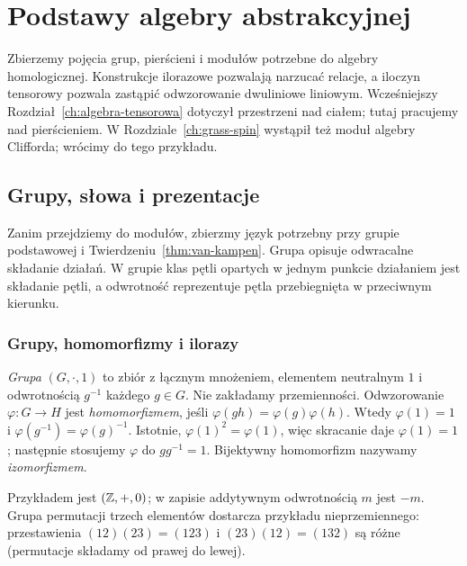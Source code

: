 \chapter{Podstawy algebry abstrakcyjnej}
\label{ch:algebra-abstrakcyjna}

Zbierzemy pojęcia grup, pierścieni i modułów potrzebne
do algebry homologicznej. Konstrukcje ilorazowe pozwalają
narzucać relacje, a iloczyn tensorowy pozwala zastąpić
odwzorowanie dwuliniowe liniowym. Wcześniejszy
Rozdział~\ref{ch:algebra-tensorowa} dotyczył przestrzeni
nad ciałem; tutaj pracujemy nad pierścieniem.
W Rozdziale~\ref{ch:grass-spin} wystąpił też moduł
algebry Clifforda; wrócimy do tego przykładu.

\section{Grupy, słowa i prezentacje}
\label{sec:grupy-prezentacje-5}

Zanim przejdziemy do modułów, zbierzmy język
potrzebny przy grupie podstawowej i
Twierdzeniu~\ref{thm:van-kampen}. Grupa opisuje
odwracalne składanie działań. W grupie klas
pętli opartych w jednym punkcie działaniem
jest składanie pętli, a odwrotność reprezentuje
pętla przebiegnięta w przeciwnym kierunku.

\subsection*{Grupy, homomorfizmy i ilorazy}

\begin{definicja}
\label{def:grupa-hom-5}
\emph{Grupa} $(G,\cdot,1)$ to zbiór z łącznym
mnożeniem, elementem neutralnym $1$ i
odwrotnością $g^{-1}$ każdego $g\in G$.
Nie zakładamy przemienności. Odwzorowanie
$\varphi:G\to H$ jest \emph{homomorfizmem},
jeśli $\varphi(gh)=\varphi(g)\varphi(h)$.
Wtedy $\varphi(1)=1$ i
$\varphi(g^{-1})=\varphi(g)^{-1}$.
Istotnie, $\varphi(1)^2=\varphi(1)$, więc skracanie daje
$\varphi(1)=1$; następnie stosujemy $\varphi$ do $gg^{-1}=1$.
Bijektywny homomorfizm nazywamy \emph{izomorfizmem}.
\end{definicja}

Przykładem jest $(\mathbb{Z},+,0)$;
w zapisie addytywnym odwrotnością $m$
jest $-m$. Grupa permutacji trzech
elementów dostarcza przykładu
nieprzemiennego: przestawienia
$(12)(23)=(123)$ i $(23)(12)=(132)$ są różne
(permutacje składamy od prawej do lewej).

